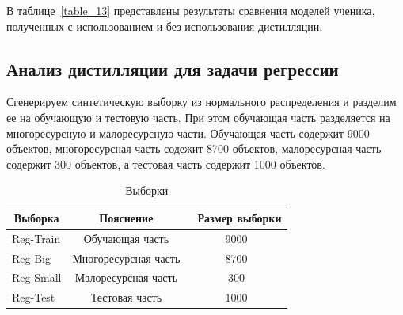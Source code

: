 \newpage
\begin{table}[h!t]
\begin{center}
\caption{Качество моделей}
\label{table_13}
\end{center}
\end{table}

В таблице~\ref{table_13} представлены результаты сравнения моделей ученика, полученных с использованием и без использования дистилляции.

\newpage
\subsection{Анализ дистилляции для задачи регрессии}
Сгенерируем синтетическую выборку из нормального распределения и разделим ее на обучающую и тестовую часть. При этом обучающая часть разделяется на многоресурсную и малоресурсную части. Обучающая часть содержит 9000 объектов, многоресурсная часть содежит 8700 объектов, малоресурсная часть содержит 300 объектов, а тестовая часть содержит 1000 объектов.

\begin{table}[h!t]
\begin{center}
\caption{Выборки}
\label{table_14}
\begin{tabular}{|c|c|c|}
\hline
	Выборка & Пояснение &\ Размер выборки\\
	\hline
	\multicolumn{1}{|l|}{Reg-Train}
	& Обучающая часть& 9000\\
	\hline
	\multicolumn{1}{|l|}{Reg-Big}
	& Многоресурсная часть& 8700\\
	\hline
	\multicolumn{1}{|l|}{Reg-Small}
	& Малоресурсная часть& 300\\
	\hline
	\multicolumn{1}{|l|}{Reg-Test}
	& Тестовая часть& 1000\\
\hline
\end{tabular}
\end{center}
\end{table}

